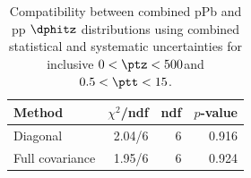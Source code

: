 \begin{table}[htp!]
\centering
\begin{tabular}{|l|r|r|r|}
\hline
Method & $\chi^2$/ndf & ndf & $p$-value \\
\hline
Diagonal & 2.04/6 & 6 & 0.916 \\
Full covariance & 1.95/6 & 6 & 0.924 \\
\hline
\end{tabular}
\caption{Compatibility between combined pPb and pp $\dphitz$ distributions using combined statistical and systematic uncertainties for inclusive $0 < \ptz < 500$\GeV and $0.5 < \ptt < 15$\GeV.}
\label{table:chisq_dphi}
\end{table}
